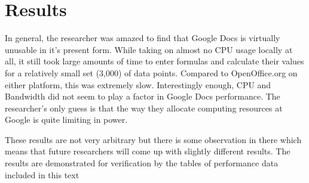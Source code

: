 \section{Results}

In general, the researcher was amazed to find that Google Docs is virtually
unusable in it's present form.  While taking on almost no CPU usage locally at
all, it still took large amounts of time to enter formulas and calculate their
values for a relatively small set (3,000) of data points.  Compared to
OpenOffice.org on either platform, this was extremely slow.  Interestingly
enough, CPU and Bandwidth did not seem to play a factor in Google Docs
performance.  The researcher's only guess is that the way they allocate
computing resources at Google is quite limiting in power.

These results are not very arbitrary but there is some observation in there
which means that future researchers will come up with slightly different
results.  The results are demonstrated for verification by the tables of
performance data included in this text
